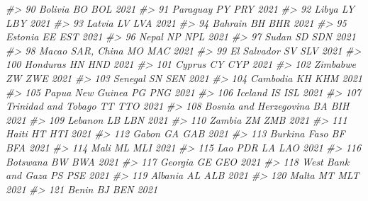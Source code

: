 \documentclass[
  xelatex, ja=standard]{bxjsbook}
\newenvironment{Shaded}{\begin{snugshade}}{\end{snugshade}}
\newcommand{\CommentTok}[1]{\textcolor[rgb]{0.56,0.35,0.01}{\textit{#1}}}
\theoremstyle{definition}
\theoremstyle{definition}
\theoremstyle{definition}
\theoremstyle{definition}
\theoremstyle{remark}
\begin{document}
\begin{Shaded}
\begin{Highlighting}[]
\CommentTok{\#\textgreater{} 90                         Bolivia    BO   BOL 2021}
\CommentTok{\#\textgreater{} 91                        Paraguay    PY   PRY 2021}
\CommentTok{\#\textgreater{} 92                           Libya    LY   LBY 2021}
\CommentTok{\#\textgreater{} 93                          Latvia    LV   LVA 2021}
\CommentTok{\#\textgreater{} 94                         Bahrain    BH   BHR 2021}
\CommentTok{\#\textgreater{} 95                         Estonia    EE   EST 2021}
\CommentTok{\#\textgreater{} 96                           Nepal    NP   NPL 2021}
\CommentTok{\#\textgreater{} 97                           Sudan    SD   SDN 2021}
\CommentTok{\#\textgreater{} 98                Macao SAR, China    MO   MAC 2021}
\CommentTok{\#\textgreater{} 99                     El Salvador    SV   SLV 2021}
\CommentTok{\#\textgreater{} 100                       Honduras    HN   HND 2021}
\CommentTok{\#\textgreater{} 101                         Cyprus    CY   CYP 2021}
\CommentTok{\#\textgreater{} 102                       Zimbabwe    ZW   ZWE 2021}
\CommentTok{\#\textgreater{} 103                        Senegal    SN   SEN 2021}
\CommentTok{\#\textgreater{} 104                       Cambodia    KH   KHM 2021}
\CommentTok{\#\textgreater{} 105               Papua New Guinea    PG   PNG 2021}
\CommentTok{\#\textgreater{} 106                        Iceland    IS   ISL 2021}
\CommentTok{\#\textgreater{} 107            Trinidad and Tobago    TT   TTO 2021}
\CommentTok{\#\textgreater{} 108         Bosnia and Herzegovina    BA   BIH 2021}
\CommentTok{\#\textgreater{} 109                        Lebanon    LB   LBN 2021}
\CommentTok{\#\textgreater{} 110                         Zambia    ZM   ZMB 2021}
\CommentTok{\#\textgreater{} 111                          Haiti    HT   HTI 2021}
\CommentTok{\#\textgreater{} 112                          Gabon    GA   GAB 2021}
\CommentTok{\#\textgreater{} 113                   Burkina Faso    BF   BFA 2021}
\CommentTok{\#\textgreater{} 114                           Mali    ML   MLI 2021}
\CommentTok{\#\textgreater{} 115                        Lao PDR    LA   LAO 2021}
\CommentTok{\#\textgreater{} 116                       Botswana    BW   BWA 2021}
\CommentTok{\#\textgreater{} 117                        Georgia    GE   GEO 2021}
\CommentTok{\#\textgreater{} 118             West Bank and Gaza    PS   PSE 2021}
\CommentTok{\#\textgreater{} 119                        Albania    AL   ALB 2021}
\CommentTok{\#\textgreater{} 120                          Malta    MT   MLT 2021}
\CommentTok{\#\textgreater{} 121                          Benin    BJ   BEN 2021}

\end{Highlighting}
\end{Shaded}
\end{document}
